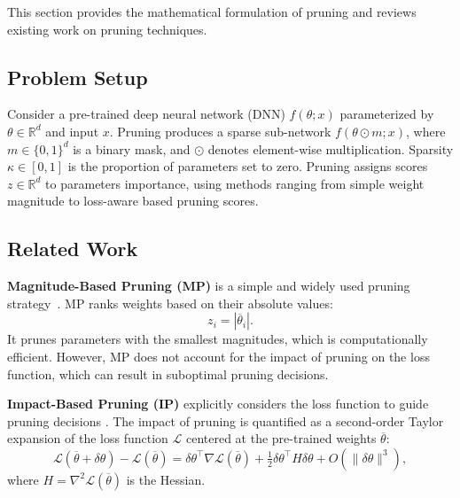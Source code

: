 This section provides the mathematical formulation of pruning and reviews existing work on pruning techniques.

\subsection{Problem Setup}

Consider a pre-trained deep neural network (DNN) $f(\theta;x)$ parameterized by $\theta \in \mathbb{R}^d$ and input $x$. Pruning produces a sparse sub-network $f(\theta \odot m; x)$, where $m \in \{0,1\}^d$ is a binary mask, and $\odot$ denotes element-wise multiplication. Sparsity $\kappa \in [0,1]$ is the proportion of parameters set to zero.
Pruning assigns scores \( z \in \mathbb{R}^d \) to parameters importance, using methods ranging from simple weight magnitude to loss-aware based pruning scores.



\subsection{Related Work}

\textbf{Magnitude-Based Pruning (MP)}  
is a simple and widely used pruning strategy~\cite{hanprune, lth, Using_Relevance, li2017pruning, SynFlow, Renda2020Comparing, gordon2020compressing, Comparing_Biases, liu2021sparse, DNNShifter}. MP ranks weights based on their absolute values:
\begin{equation}
z_i = |\overline{\theta}_i|.
\label{eq:mp_score}
\end{equation}
It prunes parameters with the smallest magnitudes, which is computationally efficient. However, MP does not account for the impact of pruning on the loss function, which can result in suboptimal pruning decisions.

\textbf{Impact-Based Pruning (IP)}  explicitly considers the loss function to guide pruning decisions \cite{brain_damage, OBS, WoodFisher}. The impact of pruning is quantified as a second-order Taylor expansion of the loss function $\mathcal{L}$ centered at the pre-trained weights $\overline{\theta}$:
\begin{equation}
\mathcal{L}(\overline{\theta} + \delta\theta)-\mathcal{L}(\overline{\theta}) 
= \delta\theta^\top \nabla \mathcal{L}(\overline{\theta})
+ \tfrac{1}{2}\delta\theta^\top H \delta\theta + O(\|\delta\theta\|^3),
\label{eq:taylor_expansion}
\end{equation}
where $H = \nabla^2 \mathcal{L}(\overline{\theta})$ is the Hessian.

